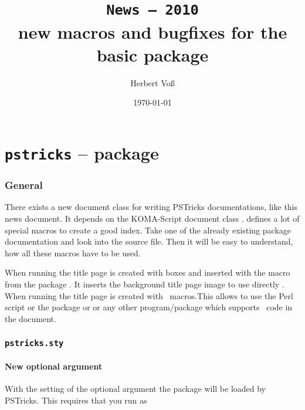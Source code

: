 \documentclass[11pt,english,BCOR10mm,DIV12,bibliography=totoc,parskip=false,smallheadings
    headexclude,footexclude,oneside]{pst-doc}
\let\Lfile\LFile
\begin{document}
\title{\texttt{News -- 2010}\\ \Large new macros and bugfixes for the
basic package }
\author{Herbert Voß}
\date{\today}

\maketitle

\clearpage
\tableofcontents

\clearpage
\part{\texttt{pstricks} -- package}

\section{General}
There exists a new document class  for writing PSTricks documentations,
like this news document. It depends on the KOMA-Script document class .
 defines a lot of special macros to create a good index. Take one of
the already existing package documentation and look into the source file. Then it will be
easy to understand, how all these macros have to be used.

When running  the title page is created with boxes and inserted 
with the macro  from the package . It
inserts the background title page image \Lfile{pst-doc-pdf} to use directly
.
When running  the title page
 is created with \PST\ macros.This allows to use the Perl script  or
the package  or  or any other program/package which
supports \PS\ code in the document.


\section{\texttt{pstricks.sty}}
\subsection{New optional argument}

With the setting of the optional argument  the package  will be loaded
by PSTricks. This requires that you run  as 
\end{document}
